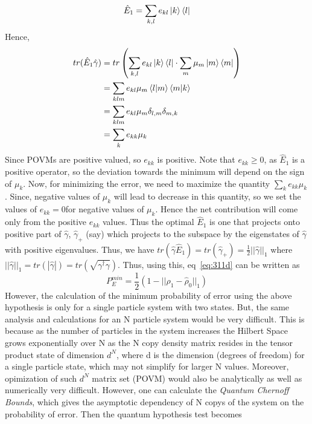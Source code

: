 \begin{equation}
    \hat{E}_1 = \sum_{k,l} e_{kl} \ket{k}\bra{l}
\end{equation}
Hence,
\begin{equation}
    \begin{split}
        tr(\hat{E}_1\hat{\gamma}) &= tr\left(\sum_{k,l} e_{kl} \ket{k}\bra{l} \cdot \sum_m \mu_m \ket{m}\bra{m}\right)\\
                                  &= \sum_{klm} e_{kl} \mu_m \braket{l|m} \braket{m|k}\\
                                  &= \sum_{klm} e_{kl} \mu_m \delta_{l,m} \delta_{m,k}\\
                                  &= \sum_{k} e_{kk} \mu_k
    \end{split}
\end{equation}
Since POVMs are positive valued, so $e_{kk}$ is positive. Note that $e_{kk} \ge 0$, as $\hat{E}_1$ is a positive operator, so the deviation towards the minimum will depend on the sign of $\mu_k$. Now, for minimizing the error, we need to maximize the quantity $\sum_{k} e_{kk} \mu_k$. Since, negative values of $\mu_k$ will lead to decrease in this quantity, so we set the values of $e_{kk} = 0$for negative values of $\mu_k$.
Hence the net contribution will come only from the positive $e_{kk}$ values. Thus the optimal $\hat{E}_1$ is one that projects onto positive part of $\hat{\gamma}$, $\hat{\gamma}_+$ (say) which projects to the subspace by the eigenstates of $\hat{\gamma}$ with positive eigenvalues. 
Thus, we have $tr(\hat{\gamma} \hat{E}_1) = tr(\hat{\gamma}_+) = \frac{1}{2}||\hat{\gamma}||_1$ where $||\hat{\gamma}||_1 = tr(|\hat{\gamma}|) = tr(\sqrt{\gamma^{\dag}\gamma})$. Thus, using this, eq~\ref{eq:311d} can be written as 
\begin{equation}
    P_E^{min} = \frac{1}{2}(1 - ||\hat{\rho}_1 - \hat{\rho}_0||_1)
\end{equation}
However, the calculation of the minimum probability of error using the above hypothesis is only for a single particle system with two states. But, the same analysis and calculations for an N particle system would be very difficult. This is because as the number of particles in the system increases the Hilbert Space grows exponentially over N as the N copy density matrix resides in the tensor product state of dimension $d^N$, where d is the dimension (degrees of freedom) for a single particle state, which may not simplify for larger N values. Moreover, opimization of such $d^N$ matrix set (POVM) would also be analytically as well as numerically very difficult. However, one can calculate the \textit{Quantum Chernoff Bounds}, which gives the asymptotic dependency of N copys of the system on the probability of error. Then the quantum hypothesis test becomes

